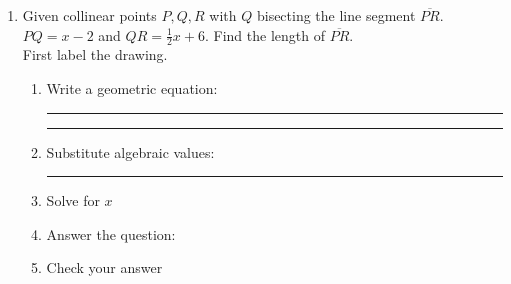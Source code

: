\documentclass[12pt, oneside]{article}
\begin{document}
\begin{enumerate}
      \item Given collinear points $P, Q, R$ with $Q$ bisecting the line segment $\overline{PR}$. $PQ=x-2$ and $QR = \frac{1}{2} x+6$. Find the length of $\overline{PR}$.\\ \bigskip
      First label the drawing.
      \begin{flushright}
      \end{flushright}
      \vspace{1cm}
      \begin{enumerate}
        \item Write a geometric equation: \rule{4cm}{0.15mm} \hspace{1cm} \rule{4cm}{0.15mm}
        \vspace{.7cm}
        \item Substitute algebraic values: \rule{4cm}{0.15mm}
        \item Solve for $x$
        \vspace{4.5cm}
        \item Answer the question:
        \vspace{2.5cm}
        \item Check your answer
      \end{enumerate}


  \end{enumerate}
\end{document}
